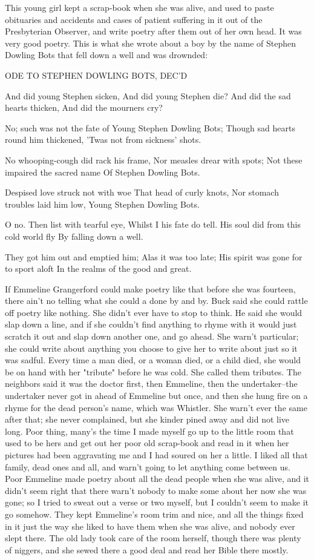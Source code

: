 This young girl kept a scrap-book when she was alive, and used to paste
obituaries and accidents and cases of patient suffering in it out of the
Presbyterian Observer, and write poetry after them out of her own head.
It was very good poetry.  This is what she wrote about a boy by the name
of Stephen Dowling Bots that fell down a well and was drownded:

ODE TO STEPHEN DOWLING BOTS, DEC'D

And did young Stephen sicken, And did young Stephen die? And did the sad
hearts thicken, And did the mourners cry?

No; such was not the fate of Young Stephen Dowling Bots; Though sad
hearts round him thickened, 'Twas not from sickness' shots.

No whooping-cough did rack his frame, Nor measles drear with spots; Not
these impaired the sacred name Of Stephen Dowling Bots.

Despised love struck not with woe That head of curly knots, Nor stomach
troubles laid him low, Young Stephen Dowling Bots.

O no.  Then list with tearful eye, Whilst I his fate do tell. His soul
did from this cold world fly By falling down a well.

They got him out and emptied him; Alas it was too late; His spirit was
gone for to sport aloft In the realms of the good and great.

If Emmeline Grangerford could make poetry like that before she was
fourteen, there ain't no telling what she could a done by and by.  Buck
said she could rattle off poetry like nothing.  She didn't ever have to
stop to think.  He said she would slap down a line, and if she couldn't
find anything to rhyme with it would just scratch it out and slap down
another one, and go ahead. She warn't particular; she could write about
anything you choose to give her to write about just so it was sadful.
Every time a man died, or a woman died, or a child died, she would be on
hand with her "tribute" before he was cold.  She called them tributes.
The neighbors said it was the doctor first, then Emmeline, then the
undertaker--the undertaker never got in ahead of Emmeline but once, and
then she hung fire on a rhyme for the dead person's name, which was
Whistler.  She warn't ever the same after that; she never complained, but
she kinder pined away and did not live long.  Poor thing, many's the time
I made myself go up to the little room that used to be hers and get out
her poor old scrap-book and read in it when her pictures had been
aggravating me and I had soured on her a little.  I liked all that
family, dead ones and all, and warn't going to let anything come between
us.  Poor Emmeline made poetry about all the dead people when she was
alive, and it didn't seem right that there warn't nobody to make some
about her now she was gone; so I tried to sweat out a verse or two
myself, but I couldn't seem to make it go somehow.  They kept Emmeline's
room trim and nice, and all the things fixed in it just the way she liked
to have them when she was alive, and nobody ever slept there.  The old
lady took care of the room herself, though there was plenty of niggers,
and she sewed there a good deal and read her Bible there mostly.

